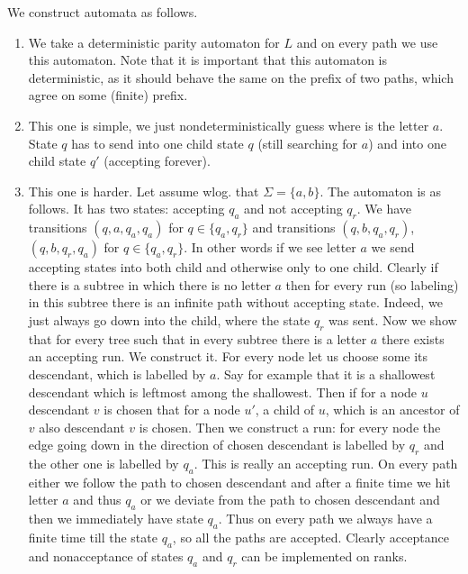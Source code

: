 {
We construct automata as follows.
\begin{enumerate}
  \item We take a deterministic parity automaton for $L$ and on every path
  we use this automaton. Note that it is important that this automaton is deterministic, as it should behave
  the same on the prefix of two paths, which agree on some (finite) prefix.
  \item This one is simple, we just nondeterministically guess where is the letter $a$.
  State $q$ has to send into one child state $q$ (still searching for $a$) and into one child state $q'$ (accepting forever).
  \item This one is harder. Let assume wlog. that $\Sigma = \{a, b\}$. The automaton is as follows.
  It has two states: accepting $q_a$ and not accepting $q_r$. We have transitions $(q, a, q_a, q_a)$ for $q \in \{q_a, q_r\}$
  and transitions $(q, b, q_a, q_r)$, $(q, b, q_r, q_a)$ for $q \in \{q_a, q_r\}$. In other words if we see letter $a$ we send
  accepting states into both child and otherwise only to one child. Clearly if there is a subtree in which there is no letter $a$
  then for every run (so labeling) in this subtree there is an infinite path without accepting state.
  Indeed, we just always go down into the child, where the state $q_r$ was sent. Now we show that for every tree
  such that in every subtree there is a letter $a$ there exists an accepting run. We construct it. For every node let us choose
  some its descendant, which is labelled by $a$. Say for example that it is a shallowest descendant which is leftmost among
  the shallowest. Then if for a node $u$ descendant $v$ is chosen that for a node $u'$, a child of $u$, which is an ancestor of $v$
  also descendant $v$ is chosen. Then we construct a run: for every node the edge going down in the direction of chosen
  descendant is labelled by $q_r$ and the other one is labelled by $q_a$. This is really an accepting run. On every path either
  we follow the path to chosen descendant and after a finite time we hit letter $a$ and thus $q_a$ or we deviate from the path
  to chosen descendant and then we immediately have state $q_a$. Thus on every path we always have a finite time till
  the state $q_a$, so all the paths are accepted. Clearly acceptance and nonacceptance of
  states $q_a$ and $q_r$ can be implemented on ranks.
\end{enumerate}
}



